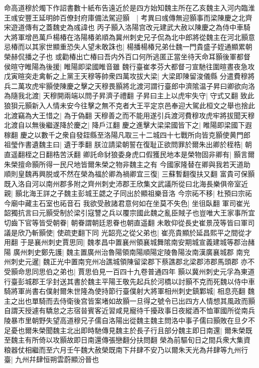 命高道穆於燭下作詔書數十紙布告遠近於是四方始知魏主所在乙亥魏主入河内臨淮王彧安豐王延明帥百僚封府庫備法駕迎顥　|{
	考異曰彧傳無迎顥事而梁陳慶之北齊宋遊道傳有之蓋魏史為彧諱也}
丙子顥入洛陽宫改元建武大赦以陳慶之為侍中車騎大將軍增邑萬戶楊椿在洛陽椿弟順為冀州刺史兄子侃為北中郎將從魏主在河北顥意忌椿而以其家世顯重恐失人望未敢誅也|{
	楊播楊椿兄弟仕魏一門貴盛子姪通顯累朝榮赫侃播之子也}
或勸椿出亡椿曰吾内外百口何所逃匿正當坐待天命耳顥後軍都督侯暄守睢陽為後援|{
	睢陽即梁國睢音雖}
魏行臺崔孝芬大都督刁宣馳往圍暄晝夜急攻戊寅暄突走禽斬之上黨王天穆等帥衆四萬攻拔大梁|{
	大梁即陳留浚儀縣}
分遣費穆將兵二萬攻虎牢顥使陳慶之擊之天穆畏顥將北渡河謂行臺郎中濟隂温子昇曰卿欲向洛為隨我北渡|{
	天穆開兩端以問子昇濟子禮翻}
子昇曰主上以虎牢失守|{
	守式又翻}
致此狼狽元顥新入人情未安今往擊之無不克者大王平定京邑奉迎大駕此桓文之舉也捨此北渡竊為大王惜之|{
	為于偽翻}
天穆善之而不能用遂引兵渡河費穆攻虎牢將拔聞天穆北渡自以無後繼遂降於慶之|{
	降戶江翻}
慶之進擊大梁梁國皆下之|{
	睢陽即梁國下遐稼翻}
慶之以數千之衆自發銍縣至洛陽凡取三十二城四十七戰所向皆克顥使黄門郎祖瑩作書遺魏主曰|{
	遺于季翻}
朕泣請梁朝誓在復耻正欲問罪於爾朱出卿於桎梏|{
	朝直遥翻桎之日翻梏苦沃翻}
卿託命豺狼委身虎口假獲民地本是榮物固非卿有|{
	顥言爾朱榮擅命顥所得一民尺地皆爾朱榮之物非魏主之有}
今國家隆替在卿與我若天道助順則皇魏再興脱或不然在榮為福於卿為禍卿宜三復|{
	三蘇暫翻復扶又翻}
富貴可保顥既入洛自河以南州郡多附之齊州刺史沛郡王欣集文武議所從曰北海長樂俱帝室近親|{
	顥北海王詳之子魏主彭城王勰之子同出於顯祖樂音洛}
今宗祏不移|{
	杜預曰宗祏今廟中藏主石室也祏音石}
我欲受赦諸君意何如在坐莫不失色|{
	坐徂臥翻}
軍司崔光韶獨抗言曰元顥受制於梁引寇讐之兵以覆宗國此魏之亂臣賊子也豈唯大王家事所宜切齒下官等皆受朝眷|{
	朝眷謂朝廷恩眷也朝直遥翻}
未敢仰從長史崔景茂等皆曰軍司議是欣乃斬顥使|{
	使疏吏翻下同}
光韶亮之從父弟也|{
	崔亮貴顯於延昌熙平之間從才用翻}
于是襄州刺史賈思同|{
	魏孝昌中置襄州領襄城舞隂南安期城宣義建城等郡治赭陽}
廣州刺史鄭先護|{
	魏主置廣州治魯陽領南陽順陽定陵魯陽汝南漢廣襄城郡}
南兖州刺史元暹|{
	魏正光中置南兖州冶譙城領陳留梁郡下蔡譙郡北梁郡沛郡馬頭郡}
亦不受顥命思同思伯之弟也|{
	賈思伯見一百四十九卷普通四年}
顥以冀州刺史元孚為東道行臺彭城郡王孚封送其書於魏主平陽王敬先起兵於河橋以討顥不克而死魏以侍中車騎將軍尚書右僕射爾朱世隆為使持節行臺僕射大將軍相州刺史鎮鄴城|{
	相息亮翻}
魏主之出也單騎而去侍衛後宫皆案堵如故顥一旦得之號令已出四方人情想其風政而顥自謂天授遽有驕怠之志宿㫺賓客近習咸見寵待千擾政事日夜縱酒不恤軍國所從南兵陵暴市里朝野失望高道穆兄子儒自洛陽出從魏主魏主問洛中事子儒曰顥敗在旦夕不足憂也爾朱榮聞魏主北出即時馳傳見魏主於長子行且部分魏主即日南還|{
	爾朱榮既至魏主有所倚以攻顥故即日南還傳張戀翻分扶問翻}
榮為前驅旬日之間兵衆大集資粮器仗相繼而至六月壬午魏大赦榮既南下幷肆不安乃以爾朱天光為幷肆等九州行臺|{
	九州幷肆恒朔雲蔚顯汾晉也}
